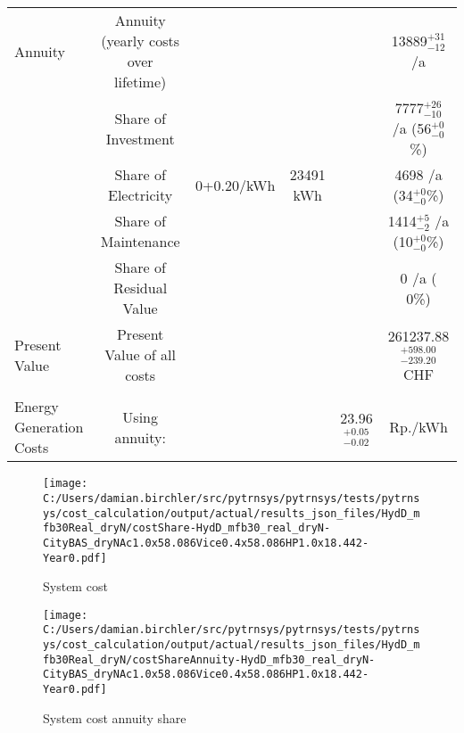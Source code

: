 \documentclass[english]{SPFShortReport}
\begin{document}
\begin{table}[!ht]
\begin{adjustbox}{max width =\textwidth}
\begin{tabular}{l | c c c c c }
Annuity & Annuity (yearly costs over lifetime)  &&& & 13889$^{\mathrm{+31}}_{\mathrm{-12}}$ /a  \\
 & Share of Investment & &&& 7777$^{\mathrm{+26}}_{\mathrm{-10}}$ /a (56$^{\mathrm{+ 0}}_{\mathrm{- 0}}$\%) \\
 & Share of Electricity & 0+0.20/kWh & 23491 kWh &  & 4698 /a (34$^{\mathrm{+ 0}}_{\mathrm{- 0}}$\%)\\
 & Share of Maintenance & &&& 1414$^{\mathrm{+ 5}}_{\mathrm{- 2}}$ /a (10$^{\mathrm{+ 0}}_{\mathrm{- 0}}$\%)\\ 
 & Share of Residual Value &&& &  0 /a ( 0\%)\\
Present Value  & Present Value of all costs  & &&& 261237.88$^{\mathrm{+598.00}}_{\mathrm{-239.20}}$ CHF \\
\hline \\ 
 Energy Generation Costs & Using annuity: &&& 23.96$^{\mathrm{+0.05}}_{\mathrm{-0.02}}$ & Rp./kWh \\
\hline
\hline
\end{tabular}
\end{adjustbox}
\label{CostsTable}
\end{table}
\begin{figure}[!htbp]
\begin{center}
\texttt{[image: C:/Users/damian.birchler/src/pytrnsys/pytrnsys/tests/pytrnsys/cost\_calculation/output/actual/results\_json\_files/HydD\_mfb30Real\_dryN/costShare-HydD\_mfb30\_real\_dryN-CityBAS\_dryNAc1.0x58.086Vice0.4x58.086HP1.0x18.442-Year0.pdf]}
\caption{System cost}
\label{systemCost}
\end{center}
\end{figure}
\begin{figure}[!htbp]
\begin{center}
\texttt{[image: C:/Users/damian.birchler/src/pytrnsys/pytrnsys/tests/pytrnsys/cost\_calculation/output/actual/results\_json\_files/HydD\_mfb30Real\_dryN/costShareAnnuity-HydD\_mfb30\_real\_dryN-CityBAS\_dryNAc1.0x58.086Vice0.4x58.086HP1.0x18.442-Year0.pdf]}
\caption{System cost annuity share}
\label{systemCostannuity}
\end{center}
\end{figure}
\end{document}
